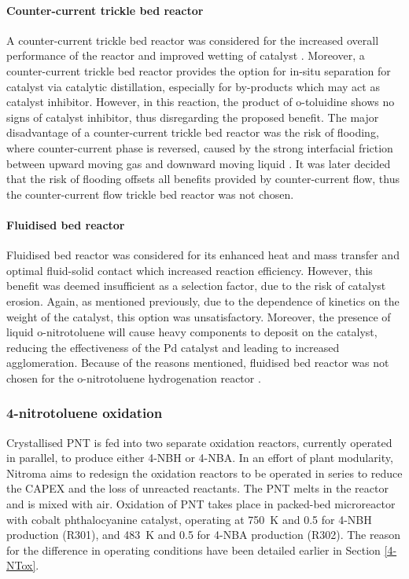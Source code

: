 
\paragraph{Counter-current trickle bed reactor}
A counter-current trickle bed reactor was considered for the increased overall performance of the reactor and improved wetting of catalyst \cite{kundu_novel_2003}. Moreover, a counter-current trickle bed reactor provides the option for in-situ separation for catalyst via catalytic distillation, especially for by-products which may act as catalyst inhibitor. However, in this reaction, the product of o-toluidine shows no signs of catalyst inhibitor, thus disregarding the proposed benefit. The major disadvantage of a counter-current trickle bed reactor was the risk of flooding, where counter-current phase is reversed, caused by the strong interfacial friction between upward moving gas and downward moving liquid \cite{breijer_prevention_2008}. It was later decided that the risk of flooding offsets all benefits provided by counter-current flow, thus the counter-current flow trickle bed reactor was not chosen. 

\paragraph{Fluidised bed reactor}
\label{fbr}
Fluidised bed reactor was considered for its enhanced heat and mass transfer and optimal fluid-solid contact which increased reaction efficiency. However, this benefit was deemed insufficient as a selection factor, due to the risk of catalyst erosion. Again, as mentioned previously, due to the dependence of kinetics on the weight of the catalyst, this option was unsatisfactory. Moreover, the presence of liquid o-nitrotoluene will cause heavy components to deposit on the catalyst, reducing the effectiveness of the Pd catalyst and leading to increased agglomeration. Because of the reasons mentioned, fluidised bed reactor was not chosen for the o-nitrotoluene hydrogenation reactor \cite{farrell_kinetics_1979}.



\subsubsection{4-nitrotoluene oxidation}

Crystallised PNT is fed into two separate oxidation reactors, currently operated in parallel, to produce either 4-NBH or 4-NBA. In an effort of plant modularity, Nitroma aims to redesign the oxidation reactors to be operated in series to reduce the CAPEX and the loss of unreacted reactants. The PNT melts in the reactor and is mixed with air. Oxidation of PNT takes place in packed-bed microreactor with cobalt phthalocyanine catalyst, operating at \SI{750}{\K} and \SI{0.5}{\atm} for 4-NBH production (R301), and \SI{483}{\K} and \SI{0.5}{\atm} for 4-NBA production (R302). The reason for the difference in operating conditions have been detailed earlier in Section \ref{4-NTox}.

